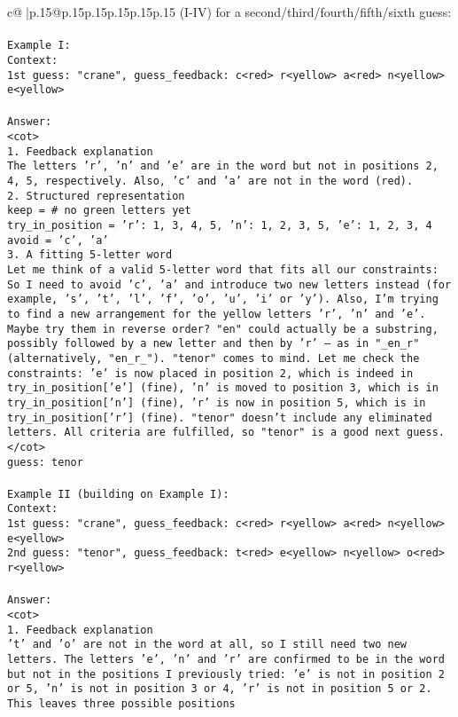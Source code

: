 \documentclass{article}
\begin{document}
{\begin{supertabular}{c@{$\;$}|p{.15\linewidth}@{}p{.15\linewidth}p{.15\linewidth}p{.15\linewidth}p{.15\linewidth}p{.15\linewidth}}
{{{(I-IV) for a second/third/fourth/fifth/sixth guess:\\ \tt \\ \tt Example I:\\ \tt Context:\\ \tt 1st guess: "crane", guess_feedback: c<red> r<yellow> a<red> n<yellow> e<yellow>\\ \tt \\ \tt Answer:\\ \tt <cot>\\ \tt 1. Feedback explanation\\ \tt The letters 'r', 'n' and 'e' are in the word but not in positions 2, 4, 5, respectively. Also, 'c' and 'a' are not in the word (red).\\ \tt 2. Structured representation\\ \tt keep = {}  # no green letters yet\\ \tt try_in_position = {'r': {1, 3, 4, 5}, 'n': {1, 2, 3, 5}, 'e': {1, 2, 3, 4}}\\ \tt avoid = {'c', 'a'}\\ \tt 3. A fitting 5-letter word\\ \tt Let me think of a valid 5-letter word that fits all our constraints: So I need to avoid {'c', 'a'} and introduce two new letters instead (for example, 's', 't', 'l', 'f', 'o', 'u', 'i' or 'y'). Also, I'm trying to find a new arrangement for the yellow letters 'r', 'n' and 'e'. Maybe try them in reverse order? "en" could actually be a substring, possibly followed by a new letter and then by 'r' — as in "_en_r" (alternatively, "en_r_"). "tenor" comes to mind. Let me check the constraints: 'e' is now placed in position 2, which is indeed in try_in_position['e'] (fine), 'n' is moved to position 3, which is in try_in_position['n'] (fine), 'r' is now in position 5, which is in try_in_position['r'] (fine). "tenor" doesn't include any eliminated letters. All criteria are fulfilled, so "tenor" is a good next guess.\\ \tt </cot>\\ \tt guess: tenor\\ \tt \\ \tt Example II (building on Example I):\\ \tt Context:\\ \tt 1st guess: "crane", guess_feedback: c<red> r<yellow> a<red> n<yellow> e<yellow>\\ \tt 2nd guess: "tenor", guess_feedback: t<red> e<yellow> n<yellow> o<red> r<yellow>\\ \tt \\ \tt Answer:\\ \tt <cot>\\ \tt 1. Feedback explanation\\ \tt 't' and 'o' are not in the word at all, so I still need two new letters. The letters 'e', 'n' and 'r' are confirmed to be in the word but not in the positions I previously tried: 'e' is not in position 2 or 5, 'n' is not in position 3 or 4, 'r' is not in position 5 or 2. This leaves three possible positions }}}
\end{supertabular}}
\end{document}
